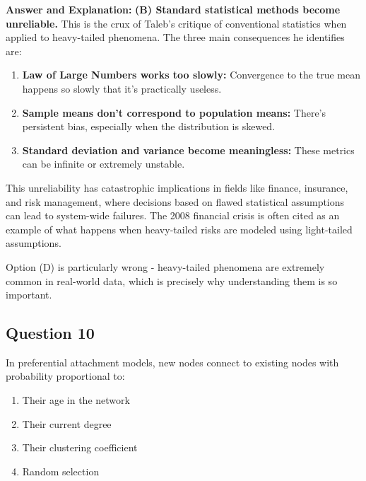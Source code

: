 \documentclass[11pt]{article}
\newenvironment{answer}{\color{answercolor}\begin{framed}\textbf{Answer and Explanation:}}{\end{framed}}
\begin{document}
\begin{answer}
\textbf{(B) Standard statistical methods become unreliable.} This is the crux of Taleb's critique of conventional statistics when applied to heavy-tailed phenomena. The three main consequences he identifies are:

\begin{enumerate}
    \item \textbf{Law of Large Numbers works too slowly:} Convergence to the true mean happens so slowly that it's practically useless.
    \item \textbf{Sample means don't correspond to population means:} There's persistent bias, especially when the distribution is skewed.
    \item \textbf{Standard deviation and variance become meaningless:} These metrics can be infinite or extremely unstable.
\end{enumerate}

This unreliability has catastrophic implications in fields like finance, insurance, and risk management, where decisions based on flawed statistical assumptions can lead to system-wide failures. The 2008 financial crisis is often cited as an example of what happens when heavy-tailed risks are modeled using light-tailed assumptions.

Option (D) is particularly wrong - heavy-tailed phenomena are extremely common in real-world data, which is precisely why understanding them is so important.
\end{answer}

\subsection{Question 10}
In preferential attachment models, new nodes connect to existing nodes with probability proportional to:

\begin{enumerate}[label=(\Alph*)]
    \item Their age in the network
    \item Their current degree
    \item Their clustering coefficient
    \item Random selection
\end{enumerate}
\end{document}
